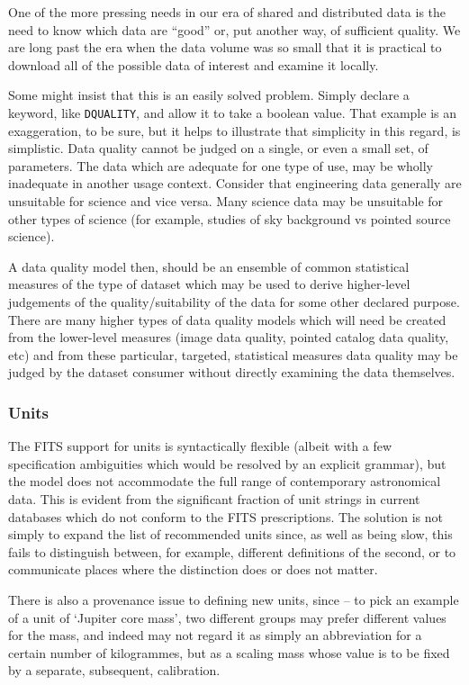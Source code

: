 \documentclass[final,authoryear,5p,times,twocolumn]{elsarticle}
\begin{document}
One of the more pressing needs in our era of shared and distributed
data is the need to know which data are ``good'' or, put another way, of
sufficient quality. We are long past the era when the data volume was
so small that it is practical to download all of the possible data of
interest and examine it locally.


Some might insist that this is an easily solved problem. Simply
declare a keyword, like \texttt{DQUALITY}, and allow it to take a boolean
value. That example is an exaggeration, to be sure, but it helps to
illustrate that simplicity in this regard, is simplistic. Data quality
cannot be judged on a single, or even a small set, of parameters. The
data which are adequate for one type of use, may be wholly inadequate
in another usage context. Consider that engineering data generally are
unsuitable for science and vice versa. Many science data may be
unsuitable for other types of science (for example, studies of sky
background vs pointed source science).


A data quality model then, should be an ensemble of common statistical
measures of the type of dataset which may be used to derive
higher-level judgements of the quality/suitability of the data for
some other declared purpose. There are many higher types of data
quality models which will need be created from the lower-level
measures (image data quality, pointed catalog data quality, etc) and
from these particular, targeted, statistical measures data quality may
be judged by the dataset consumer without directly examining the data
themselves.


\subsubsection{Units}


The FITS support for units is syntactically flexible (albeit with
a few specification ambiguities which would be resolved by an explicit
grammar), but the model does not accommodate the full range of
contemporary astronomical data.  This is evident from the significant
fraction of unit strings in current databases which do not conform to
the FITS prescriptions.  The solution is not simply to expand the list
of recommended units since, as well as being slow, this fails to
distinguish between, for example, different definitions of the second,
or to communicate places where the distinction does or does not
matter.

There is also a provenance issue to defining new units, since -- to
pick an example of a unit of `Jupiter core mass', two different
groups may prefer different values for the mass, and indeed may not
regard it as simply an abbreviation for a certain number of
kilogrammes, but as a scaling mass whose value is to be fixed by a
separate, subsequent, calibration.
\end{document}
